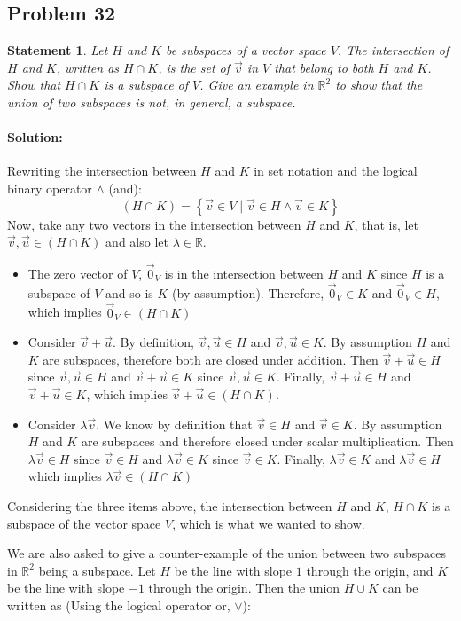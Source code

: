 \documentclass[12pt, letterpaper]{article}
\newcommand{\R}{\mathbb{R}}
\theoremstyle{statement}
\theoremstyle{statement}
\newtheorem*{atmStat}{Statement}
\newenvironment{Solution}{\noindent\ignorespaces\paragraph{Solution:}}{\hfill \ding{122}\par\noindent}
\begin{document}
    \subsection*{Problem 32}
    \begin{atmStat}
    Let $H$ and $K$ be subspaces of a vector space $V$. The intersection of $H$ and $K$, written as $H \cap K$, is the set of $\Vec{v}$ in $V$ that belong to both $H$ and $K$. Show that $H \cap K$ is a subspace of $V$. Give an example in $\R^2$ to show that the union of two subspaces is not, in general, a subspace.
    \end{atmStat}
    \begin{Solution}
    Rewriting the intersection between $H$ and $K$ in set notation and the logical binary operator $\land$  (and):
    $$
    (H\cap K) = \left\{
    \Vec{v}\in V
    \mid
    \Vec{v}\in H \land \Vec{v}\in K
    \right\}
    $$
    Now, take any two vectors in the intersection between $H$ and $K$, that is, let $\Vec{v}, \Vec{u}\in(H\cap K)$ and also let $\lambda \in \R$. 
    \begin{itemize}
        \item The zero vector of $V$, $\Vec{0}_V$ is in the intersection between $H$ and $K$ since $H$ is a subspace of $V$ and so is $K$ (by assumption). Therefore, $\Vec{0}_V\in K$ and $\Vec{0}_V\in H$, which implies $\Vec{0}_V \in (H \cap K)$
        \item Consider $\Vec{v}+\Vec{u}$. By definition, $\Vec{v}, \Vec{u} \in H$ and $\Vec{v}, \Vec{u} \in K$. By assumption $H$ and $K$ are subspaces, therefore both are closed under addition. Then $\Vec{v}+\Vec{u} \in H$ since $\Vec{v}, \Vec{u} \in H$ and $\Vec{v}+\Vec{u} \in K$ since $\Vec{v}, \Vec{u} \in K$. Finally, $\Vec{v}+\Vec{u} \in H$ and $\Vec{v} + \Vec{u} \in K$, which implies $\Vec{v}+\Vec{u} \in (H \cap K)$. 
        \item Consider $\lambda\Vec{v}$. We know by definition that $\Vec{v}\in H$ and $\Vec{v} \in K$. By assumption $H$ and $K$ are subspaces and therefore closed under scalar multiplication. Then $\lambda\Vec{v} \in H$ since $\Vec{v} \in H$ and $\lambda\Vec{v} \in K$ since $\Vec{v} \in K$. Finally, $\lambda\Vec{v} \in K$ and $\lambda\Vec{v} \in H$ which implies $\lambda\Vec{v} \in (H \cap K)$
    \end{itemize}
    Considering the three items above, the intersection between $H$ and $K$, $H \cap K$ is a subspace of the vector space $V$, which is what we wanted to show. 
    
    We are also asked to give a counter-example of the union between two subspaces in $\R^2$ being a subspace. Let $H$ be the line with slope $1$ through the origin, and $K$ be the line with slope $-1$ through the origin. Then the union $H \cup K$ can be written as (Using the logical operator or, $\lor$):
    

\end{Solution}
\end{document}
